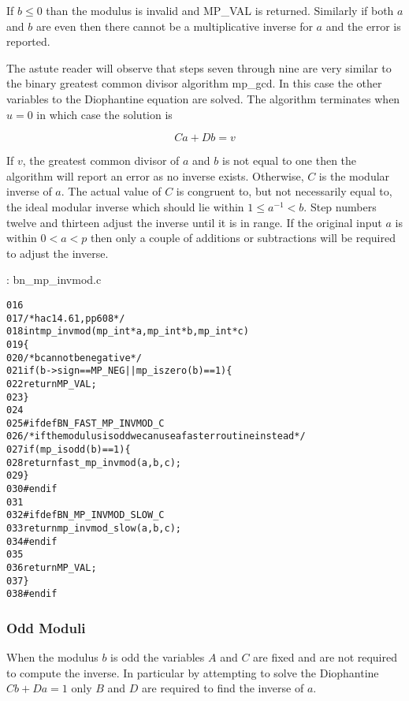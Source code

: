 \documentclass[b5paper]{book}
\begin{document}
If $b \le 0$ than the modulus is invalid and MP\_VAL is returned.  Similarly if both $a$ and $b$ are even then there cannot be a multiplicative
inverse for $a$ and the error is reported.  

The astute reader will observe that steps seven through nine are very similar to the binary greatest common divisor algorithm mp\_gcd.  In this case
the other variables to the Diophantine equation are solved.  The algorithm terminates when $u = 0$ in which case the solution is

\begin{equation}
Ca + Db = v
\end{equation}

If $v$, the greatest common divisor of $a$ and $b$ is not equal to one then the algorithm will report an error as no inverse exists.  Otherwise, $C$
is the modular inverse of $a$.  The actual value of $C$ is congruent to, but not necessarily equal to, the ideal modular inverse which should lie 
within $1 \le a^{-1} < b$.  Step numbers twelve and thirteen adjust the inverse until it is in range.  If the original input $a$ is within $0 < a < p$ 
then only a couple of additions or subtractions will be required to adjust the inverse.

\vspace{+3mm}\begin{small}
\hspace{-5.1mm}{\bf File}: bn\_mp\_invmod.c
\vspace{-3mm}
\begin{alltt}
016   
017   /* hac 14.61, pp608 */
018   int mp_invmod (mp_int * a, mp_int * b, mp_int * c)
019   \{
020     /* b cannot be negative */
021     if (b->sign == MP_NEG || mp_iszero(b) == 1) \{
022       return MP_VAL;
023     \}
024   
025   #ifdef BN_FAST_MP_INVMOD_C
026     /* if the modulus is odd we can use a faster routine instead */
027     if (mp_isodd (b) == 1) \{
028       return fast_mp_invmod (a, b, c);
029     \}
030   #endif
031   
032   #ifdef BN_MP_INVMOD_SLOW_C
033     return mp_invmod_slow(a, b, c);
034   #endif
035   
036     return MP_VAL;
037   \}
038   #endif
\end{alltt}
\end{small}

\subsubsection{Odd Moduli}

When the modulus $b$ is odd the variables $A$ and $C$ are fixed and are not required to compute the inverse.  In particular by attempting to solve
the Diophantine $Cb + Da = 1$ only $B$ and $D$ are required to find the inverse of $a$.  
\end{document}
